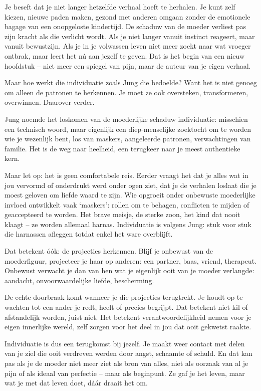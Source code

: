 Je beseft dat je niet langer hetzelfde verhaal hoeft te herhalen. Je kunt zelf kiezen, nieuwe paden maken, gezond met anderen omgaan zonder de emotionele bagage van een onopgeloste kindertijd. De schaduw van de moeder verliest pas zijn kracht als die verlicht wordt. Als je niet langer vanuit instinct reageert, maar vanuit bewustzijn. Als je in je volwassen leven niet meer zoekt naar wat vroeger ontbrak, maar leert het nú aan jezelf te geven. Dat is het begin van een nieuw hoofdstuk – niet meer een spiegel van pijn, maar de auteur van je eigen verhaal.

Maar hoe werkt die individuatie zoals Jung die bedoelde? Want het is niet genoeg om alleen de patronen te herkennen. Je moet ze ook oversteken, transformeren, overwinnen. Daarover verder.

Jung noemde het loskomen van de moederlijke schaduw individuatie: misschien een technisch woord, maar eigenlijk een diep-menselijke zoektocht om te worden wie je wezenlijk bent, los van maskers, aangeleerde patronen, verwachtingen van familie. Het is de weg naar heelheid, een terugkeer naar je meest authentieke kern.

Maar let op: het is geen comfortabele reis. Eerder vraagt het dat je alles wat in jou vervormd of onderdrukt werd onder ogen ziet, dat je de verhalen loslaat die je moest geloven om liefde waard te zijn. Wie opgroeit onder onbewuste moederlijke invloed ontwikkelt vaak ‘maskers’: rollen om te behagen, conflicten te mijden of geaccepteerd te worden. Het brave meisje, de sterke zoon, het kind dat nooit klaagt – ze worden allemaal harnas. Individuatie is volgens Jung: stuk voor stuk die harnassen afleggen totdat enkel het ware overblijft.

Dat betekent óók: de projecties herkennen. Blijf je onbewust van de moederfiguur, projecteer je haar op anderen: een partner, baas, vriend, therapeut. Onbewust verwacht je dan van hen wat je eigenlijk ooit van je moeder verlangde: aandacht, onvoorwaardelijke liefde, bescherming.

De echte doorbraak komt wanneer je die projecties terugtrekt. Je houdt op te wachten tot een ander je redt, heelt of precies begrijpt. Dat betekent niet kil of afstandelijk worden, juist niet. Het betekent verantwoordelijkheid nemen voor je eigen innerlijke wereld, zelf zorgen voor het deel in jou dat ooit gekwetst raakte.

Individuatie is dus een terugkomst bij jezelf. Je maakt weer contact met delen van je ziel die ooit verdreven werden door angst, schaamte of schuld. En dat kan pas als je de moeder niet meer ziet als bron van alles, niet als oorzaak van al je pijn of als ideaal van perfectie – maar als beginpunt. Ze gaf je het leven, maar wat je met dat leven doet, dáár draait het om.


